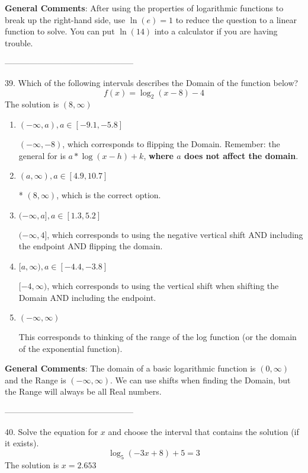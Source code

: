 \documentclass{extbook}[14pt]
\begin{document}
\textbf{General Comments}: After using the properties of logarithmic functions to break up the right-hand side, use $\ln(e) = 1$ to reduce the question to a linear function to solve. You can put $\ln(14)$ into a calculator if you are having trouble.

-----------------------------------------------

39. Which of the following intervals describes the Domain of the function below?
\[ f(x) = \log_2{(x-8)}-4 \] 
The solution is $ (8, \infty) $ 

\begin{enumerate}[label=\Alph*.] 
\item $ (-\infty, a), a \in [-9.1, -5.8] $ 

 $(-\infty, -8)$, which corresponds to flipping the Domain. Remember: the general for is $a*\log(x-h)+k$, \textbf{where $a$ does not affect the domain}. 
\item $ (a, \infty), a \in [4.9, 10.7] $ 

 * $(8, \infty)$, which is the correct option. 
\item $ (-\infty, a], a \in [1.3, 5.2] $ 

 $(-\infty, 4]$, which corresponds to using the negative vertical shift AND including the endpoint AND flipping the domain. 
\item $ [a, \infty), a \in [-4.4, -3.8] $ 

 $[-4, \infty)$, which corresponds to using the vertical shift when shifting the Domain AND including the endpoint. 
\item $ (-\infty, \infty) $ 

 This corresponds to thinking of the range of the log function (or the domain of the exponential function). 
\end{enumerate} 
 
\textbf{General Comments}: The domain of a basic logarithmic function is $(0, \infty)$ and the Range is $(-\infty, \infty)$. We can use shifts when finding the Domain, but the Range will always be all Real numbers.

-----------------------------------------------

40. Solve the equation for $x$ and choose the interval that contains the solution (if it exists).
\[ \log_{5}{(-3x+8)}+5 = 3 \] 
The solution is $ x = 2.653 $ 
\end{document}
